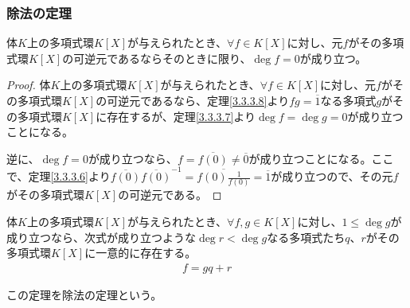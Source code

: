 \documentclass[dvipdfmx]{jsarticle}
\begin{document}
\subsubsection{除法の定理}%
\begin{thm}\label{3.3.3.11}
体$K$上の多項式環$K[ X]$が与えられたとき、$\forall f \in K[ X]$に対し、元$f$がその多項式環$K[ X]$の可逆元であるならそのときに限り、$\deg f = 0$が成り立つ。
\end{thm}
\begin{proof}
体$K$上の多項式環$K[ X]$が与えられたとき、$\forall f \in K[ X]$に対し、元$f$がその多項式環$K[ X]$の可逆元であるなら、定理\ref{3.3.3.8}より$fg = \overline{1}$なる多項式$g$がその多項式環$K[ X]$に存在するが、定理\ref{3.3.3.7}より$\deg f = \deg g = 0$が成り立つことになる。\par
逆に、$\deg f = 0$が成り立つなら、$f = \overline{f(0)} \neq \overline{0}$が成り立つことになる。ここで、定理\ref{3.3.3.6}より$\overline{f(0)}\overline{f(0)}^{-1} = \overline{f(0)\frac{1}{f(0)}} = \overline{1}$が成り立つので、その元$f$がその多項式環$K[ X]$の可逆元である。
\end{proof}
\begin{thm}[除法の定理]\label{3.3.3.12}
体$K$上の多項式環$K[ X]$が与えられたとき、$\forall f,g \in K[ X]$に対し、$1 \leq \deg g$が成り立つなら、次式が成り立つような$\deg r < \deg g$なる多項式たち$q$、$r$がその多項式環$K[ X]$に一意的に存在する。
\begin{align*}
f = gq + r
\end{align*}\par
この定理を除法の定理という。
\end{thm}
\end{document}
